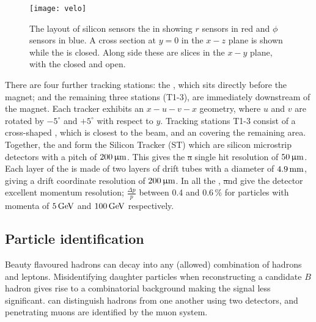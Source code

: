 
\begin{figure}
  \begin{center}
    \texttt{[image: velo]}
  \end{center}
  \caption[\lhcb \velo]
  {\small
    The layout of silicon sensors the \velo in showing $r$ sensors in red and $\phi$ sensors in
    blue.
    A cross section at $y=0$ in the $x-z$ plane is shown while the \velo is closed.
    Along side these are slices in the $x-y$ plane, with the \velo closed and open.
  }
  \label{fig:lhcb:velo}
\end{figure}

There are four further tracking stations: the \ttracker, which sits directly
before the magnet; and the remaining three stations (T1-3), are immediately downstream of the
magnet.
Each tracker exhibits an $x-u-v-x$ geometry, where $u$ and $v$ are rotated by $-5^\circ$ and
$+5^\circ$ with respect to $y$.
Tracking stations T1-3 consist of a cross-shaped \intr, which is closest to the beam, and
an \ot covering the remaining area.
Together, the \ttracker and \intr form the Silicon Tracker (ST) which are silicon microstrip
detectors with a pitch of $200\,\upmu\rm m$.
This gives the \st a single hit resolution of $50\,\upmu\rm m$.
Each layer of the \ot is made of two layers of drift tubes with a diameter of $4.9\rm \,mm$, giving a
drift coordinate resolution of $200\,\upmu\rm m$.
In all the \velo, \st and \ot give the \lhcb detector excellent momentum resolution;
$\tfrac{\Delta p}{p}$ between 0.4 and 0.6\,\% for particles with momenta of $5\mathrm{\,Ge\kern -0.1em V}$ and $100\mathrm{\,Ge\kern -0.1em V}$
respectively.


\subsection{Particle identification}
Beauty flavoured hadrons can decay into any (allowed) combination of hadrons and
leptons.
Misidentifying daughter particles when reconstructing a candidate $B$ hadron gives rise to a
combinatorial background making the signal less significant.
\lhcb can distinguish hadrons from one another using two \rich detectors, and penetrating muons are
identified by the muon system.


